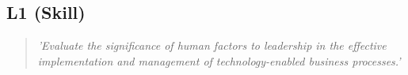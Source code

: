 \subsection{L1 (Skill)}

  \begin{quote}
    \textit{'Evaluate the significance of human factors to
    leadership in the effective implementation and
    management of technology-enabled business processes.'}
  \end{quote}

\newpage